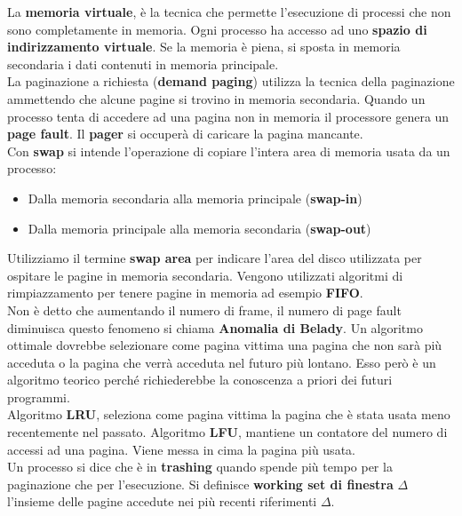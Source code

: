 \documentclass{article}
\begin{document}
La \textbf{memoria virtuale}, è la tecnica che permette l'esecuzione di processi che non sono completamente in memoria. Ogni processo ha accesso ad uno \textbf{spazio di indirizzamento virtuale}. Se la memoria è piena, si sposta in memoria secondaria i dati contenuti in memoria principale.\\
La paginazione a richiesta (\textbf{demand paging}) utilizza la tecnica della paginazione ammettendo che alcune pagine si trovino in memoria secondaria. Quando un processo tenta di accedere ad una pagina non in memoria il processore genera un \textbf{page fault}. Il \textbf{pager} si occuperà di caricare la pagina mancante.\\
Con \textbf{swap} si intende l'operazione di copiare l'intera area di memoria usata da un processo:
\begin{itemize}
  \item Dalla memoria secondaria alla memoria principale (\textbf{swap-in})
  \item Dalla memoria principale alla memoria secondaria (\textbf{swap-out})
\end{itemize}
Utilizziamo il termine \textbf{swap area} per indicare l'area del disco utilizzata per ospitare le pagine in memoria secondaria.
Vengono utilizzati algoritmi di rimpiazzamento per tenere pagine in memoria ad esempio \textbf{FIFO}. \\
Non è detto che aumentando il numero di frame, il numero di page fault diminuisca questo fenomeno si chiama \textbf{Anomalia di Belady}.
Un algoritmo ottimale dovrebbe selezionare come pagina vittima una pagina che non sarà più acceduta o la pagina che verrà acceduta nel futuro più lontano.
Esso però è un algoritmo teorico perché richiederebbe la conoscenza a priori dei futuri programmi.\\
Algoritmo \textbf{LRU}, seleziona come pagina vittima la pagina che è stata usata meno recentemente nel passato.
Algoritmo \textbf{LFU}, mantiene un contatore del numero di accessi ad una pagina. Viene messa in cima la pagina più usata.\\
Un processo si dice che è in \textbf{trashing} quando spende più tempo per la paginazione che per l'esecuzione. Si definisce \textbf{working set di finestra} $\Delta$ l'insieme delle pagine accedute nei più recenti riferimenti $\Delta$.
\end{document}
